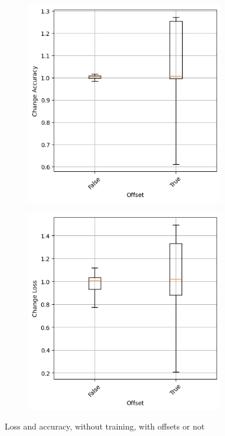 \begin{figure}
    \begin{subfigure}{0.5\textwidth}
        \centering
        \includegraphics[width=0.95\textwidth]{plots/Offset_NotTrained_accuracy.png}
    \end{subfigure}
    \begin{subfigure}{0.5\textwidth}
        \centering
        \includegraphics[width=0.95\textwidth]{plots/Offset_NotTrained_loss.png}
    \end{subfigure}
    \caption{Loss and accuracy, without training, with offsets or not}
    \label{fig:offset-notraining}
\end{figure}
